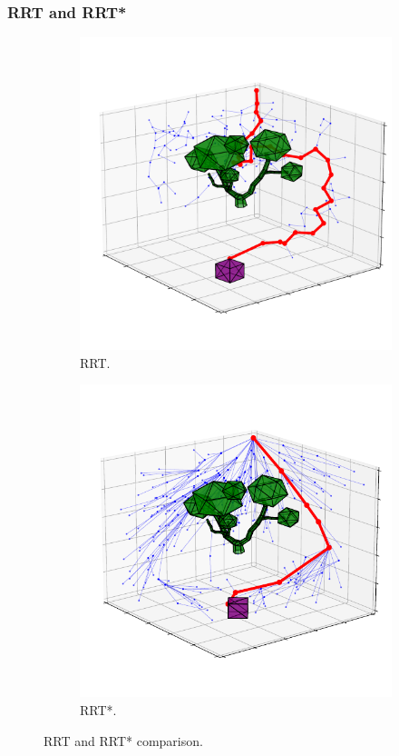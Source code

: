 \documentclass{beamer}
\begin{document}
\begin{frame}
	\frametitle{RRT and RRT*}	
	\begin{figure}[!ht]
		\centering  
		\begin{subfigure}[b]{0.45\textwidth}
			\includegraphics[width=\textwidth]{figChap5/3D_exampleRRT314it_big.pdf}
			\caption{RRT.} 
		\end{subfigure} 
		\begin{subfigure}[b]{0.45\textwidth}
			\includegraphics[width=\textwidth]{figChap5/3D_exampleNew471it_cropped.pdf}
			\caption{RRT*.} 
		\end{subfigure} 
		\caption{RRT and RRT* comparison.} 
	  \end{figure}
\end{frame}	
\end{document}
